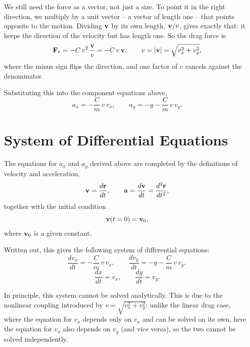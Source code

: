 \documentclass[11pt]{article}
\begin{document}
We still need the force as a vector, not just a size. To point it in
the right direction, we multiply by a unit vector -- a vector of
length one -- that points opposite to the motion. Dividing $\vb{v}$ by
its own length, $\vb{v}/v$, gives exactly that: it keeps the direction
of the velocity but has length one. So the drag force is
\begin{equation}
\vb{F}_r = -C\,v^2\,\frac{\vb{v}}{v} = -C\,v\,\vb{v},
\qquad v = |\vb{v}| = \sqrt{v_x^2+v_y^2},
\end{equation}
where the minus sign flips the direction, and one factor of $v$
cancels against the denominator.

Substituting this into the component equations above,
\begin{equation}
    a_x = -\frac{C}{m}\,v\,v_x, \qquad
    a_y = -g - \frac{C}{m}\,v\,v_y.
    \label{eq:accel_components}
\end{equation}

\section{System of Differential Equations}

The equations for $a_x$ and $a_y$ derived above are completed by the
definitions of velocity and acceleration,
\begin{equation}
    \vb{v} = \frac{d\vb{r}}{dt}, \qquad
    \vb{a} = \frac{d\vb{v}}{dt} = \frac{d^2\vb{r}}{dt^2},
\end{equation}
together with the initial condition
\begin{equation}
    \vb{v}(t=0) = \vb{v}_0,
\end{equation}
where $\vb{v}_0$ is a given constant.

Written out, this gives the following system of differential
equations:
\begin{equation}
    \frac{dv_x}{dt} = -\frac{C}{m}\,v\,v_x, \qquad
    \frac{dv_y}{dt} = -g - \frac{C}{m}\,v\,v_y,
\end{equation}
\begin{equation}
    \frac{dx}{dt} = v_x, \qquad
    \frac{dy}{dt} = v_y.
\end{equation}

In principle, this system cannot be solved analytically. This is due
to the nonlinear coupling introduced by $v = \sqrt{v_x^2+v_y^2}$:
unlike the linear drag case, where the equation for $v_x$ depends only
on $v_x$ and can be solved on its own, here the equation for $v_x$
also depends on $v_y$ (and vice versa), so the two cannot be solved
independently.
\end{document}

